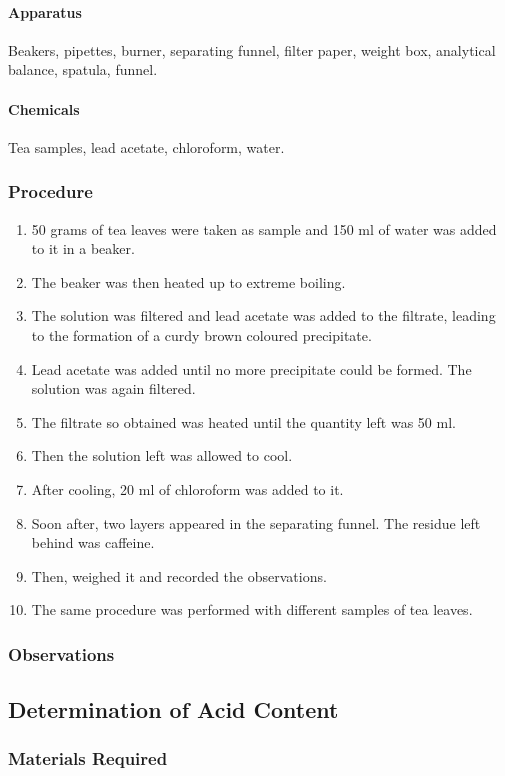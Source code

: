 \documentclass[11pt]{article}
\begin{document}
\paragraph{Apparatus}
Beakers, pipettes, burner, separating funnel, filter paper, weight box, analytical balance, spatula, funnel.
\paragraph{Chemicals}
Tea samples, lead acetate, chloroform, water.

\subsubsection{Procedure}
\begin{enumerate}
\item 50 grams of tea leaves were taken as sample and 150 ml of water was added to it in a
beaker.
\item  The beaker was then heated up to extreme boiling.
\item The solution was filtered and lead acetate was added to the filtrate, leading to the formation
  of a curdy brown coloured precipitate.
\item Lead acetate was added until no more precipitate could be formed. The solution was again filtered.
\item The filtrate so obtained was heated until the quantity left was 50 ml.
\item Then the solution left was allowed to cool.
\item After cooling, 20 ml of chloroform was added to it.
\item Soon after, two layers appeared in the separating funnel. The residue left behind was caffeine.
\item Then, weighed it and recorded the observations.
\item The same procedure was performed with different samples of tea leaves.
\end{enumerate}
\subsubsection{Observations}

\subsection{Determination of Acid Content}
\subsubsection{Materials Required}
\end{document}
